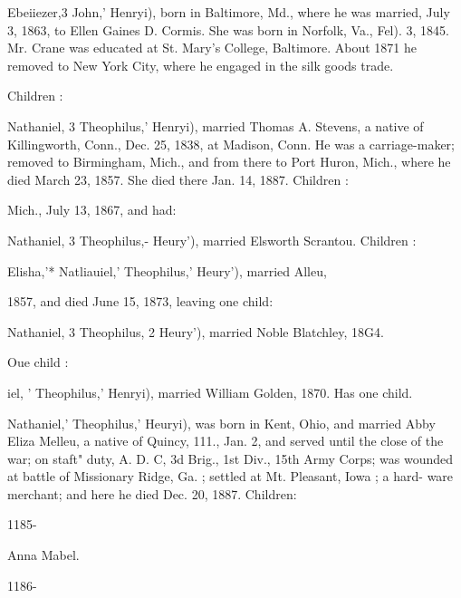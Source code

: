 \documentclass{book}
\begin{document}
Ebeiiezer,3 John,' Henryi), born in Baltimore, Md., where he 
was married, July 3, 1863, to Ellen Gaines D. Cormis. She was 
born in Norfolk, Va., Fel). 3, 1845. Mr. Crane was educated 
at St. Mary's College, Baltimore. About 1871 he removed to 
New York City, where he engaged in the silk goods trade. 

Children : 








Nathaniel, 3 Theophilus,' Henryi), married Thomas A. Stevens, 
a native of Killingworth, Conn., Dec. 25, 1838, at Madison, 
Conn. He was a carriage-maker; removed to Birmingham, 
Mich., and from there to Port Huron, Mich., where he died 
March 23, 1857. She died there Jan. 14, 1887. Children : 






Mich., July 13, 1867, and had: 








Nathaniel, 3 Theophilus,- Heury'), married Elsworth Scrantou. 
Children : 










Elisha,'* Natliauiel,' Theophilus,' Heury'), married Alleu, 

1857, and died June 15, 1873, leaving one child: 


Nathaniel, 3 Theophilus, 2 Heury'), married Noble Blatchley, 18G4. 

Oue child : 

iel, ' Theophilus,' Henryi), married William Golden, 1870. Has 
one child. 

Nathaniel,' Theophilus,' Heuryi), was born in Kent, Ohio, and 
married Abby Eliza Melleu, a native of Quincy, 111., Jan. 2, 
and served until the close of the war; on staft" duty, A. D. C, 
3d Brig., 1st Div., 15th Army Corps; was wounded at battle of 
Missionary Ridge, Ga. ; settled at Mt. Pleasant, Iowa ; a hard- 
ware merchant; and here he died Dec. 20, 1887. Children: 



1185- 




Anna Mabel. 


1186- 
\end{document}
